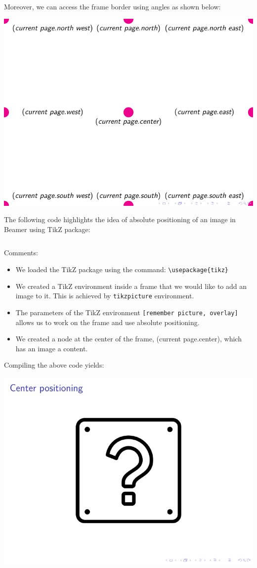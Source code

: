 \begin{column}{0.5\textwidth}
Moreover, we can access the frame border using angles as shown below:

\includegraphics[page=2]{examples/beamer/beamer-frame-position.pdf}

The following code highlights the idea of absolute positioning of an image in Beamer using TikZ package:

\inputminted[linenos=true]{latex}{examples/beamer/beamerfigure06.tex}

Comments:

\begin{itemize}
  \item We loaded the TikZ package using the command: \verb|\usepackage{tikz}|
  \item We created a TikZ environment inside a frame that we would like to add an image to it. This is achieved by \verb|tikzpicture| environment.
  \item The parameters of the TikZ environment \verb|[remember picture, overlay]| allows us to work on the frame and use absolute positioning.
  \item We created a node at the center of the frame, (current page.center), which has an image a content.
\end{itemize}

Compiling the above code yields:

\includegraphics[page=1]{examples/beamer/beamerfigure06.pdf}


\end{column}
